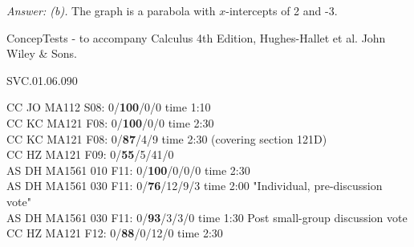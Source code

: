 {\it Answer: (b).} The graph is a parabola with $x$-intercepts of 2 and -3.
 


\medskip
ConcepTests - to accompany Calculus 4th Edition, Hughes-Hallet et al. John Wiley \& Sons.

SVC.01.06.090


CC JO MA112 S08: 0/{\bf 100}/0/0 time 1:10 \\ 
CC KC MA121 F08: 0/{\bf 100}/0/0 time 2:30 \\ 
CC KC MA121 F08: 0/{\bf 87}/4/9 time 2:30 (covering section 121D)\\ 
CC HZ MA121 F09: 0/{\bf55}/5/41/0  \\
AS DH MA1561 010 F11: 0/{\bf100}/0/0/0 time 2:30  \\
AS DH MA1561 030 F11: 0/{\bf76}/12/9/3 time 2:00 "Individual, pre-discussion vote" \\
AS DH MA1561 030 F11: 0/{\bf93}/3/3/0 time 1:30 Post small-group discussion vote \\
CC HZ MA121 F12: 0/{\bf88}/0/12/0 time 2:30  \\
